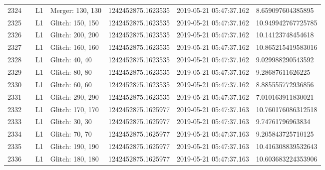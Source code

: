 \begin{longtable}{lllllll}
2324 &                                                    &       L1 &  Merger: 130, 130 &  1242452875.1623535 &  2019-05-21 05:47:37.162 &   8.659097604385895 \\
2325 &                                                    &       L1 &  Glitch: 150, 150 &  1242452875.1623535 &  2019-05-21 05:47:37.162 &  10.949942767725785 \\
2326 &                                                    &       L1 &  Glitch: 200, 200 &  1242452875.1623535 &  2019-05-21 05:47:37.162 &   10.14123748454618 \\
2327 &                                                    &       L1 &  Glitch: 160, 160 &  1242452875.1623535 &  2019-05-21 05:47:37.162 &  10.865215419583016 \\
2328 &                                                    &       L1 &    Glitch: 40, 40 &  1242452875.1623535 &  2019-05-21 05:47:37.162 &   9.029988290543592 \\
2329 &                                                    &       L1 &    Glitch: 80, 80 &  1242452875.1623535 &  2019-05-21 05:47:37.162 &    9.28687611626225 \\
2330 &                                                    &       L1 &    Glitch: 60, 60 &  1242452875.1623535 &  2019-05-21 05:47:37.162 &   8.885555772936856 \\
2331 &                                                    &       L1 &  Glitch: 290, 290 &  1242452875.1623535 &  2019-05-21 05:47:37.162 &   7.010163911830021 \\
2332 &                                                    &       L1 &  Glitch: 170, 170 &  1242452875.1625977 &  2019-05-21 05:47:37.163 &  10.760176086312518 \\
2333 &                                                    &       L1 &    Glitch: 30, 30 &  1242452875.1625977 &  2019-05-21 05:47:37.163 &    9.74761796963834 \\
2334 &                                                    &       L1 &    Glitch: 70, 70 &  1242452875.1625977 &  2019-05-21 05:47:37.163 &   9.205843725710125 \\
2335 &                                                    &       L1 &  Glitch: 190, 190 &  1242452875.1625977 &  2019-05-21 05:47:37.163 &  10.416308839532643 \\
2336 &                                                    &       L1 &  Glitch: 180, 180 &  1242452875.1625977 &  2019-05-21 05:47:37.163 &  10.603683224353906 \\

\end{longtable}
